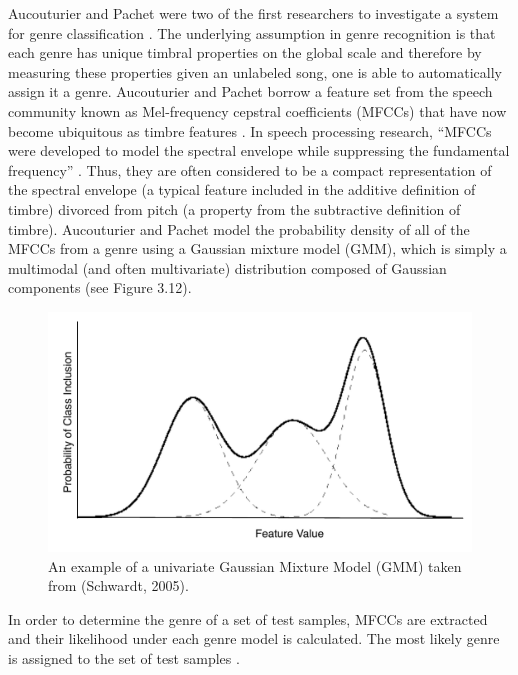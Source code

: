\documentclass[12pt]{report} 	%
\numberwithin{figure}{chapter}
\numberwithin{table}{chapter}
\numberwithin{equation}{chapter}
\begin{document}
\begin{flushleft}
Aucouturier and Pachet were two of the first researchers to investigate a system for genre classification \cite{Aucouturier:2002gf}. The underlying assumption in genre recognition is that each genre has unique timbral properties on the global scale and therefore by measuring these properties given an unlabeled song, one is able to automatically assign it a genre. Aucouturier and Pachet borrow a feature set from the speech community known as Mel-frequency cepstral coefficients (MFCCs) that have now become ubiquitous as timbre features \cite[p. 1]{Aucouturier:2002gf}. In speech processing research, ``MFCCs were developed to model the spectral envelope while suppressing the fundamental frequency'' \cite[p. 1]{Jensen:2006dw}. Thus, they are often considered to be a compact representation of the spectral envelope (a typical feature included in the additive definition of timbre) divorced from pitch (a property from the subtractive definition of timbre). Aucouturier and Pachet model the probability density of all of the MFCCs from a genre using a Gaussian mixture model (GMM), which is simply a multimodal (and often multivariate) distribution composed of Gaussian components (see Figure 3.12). 
\begin{figure}[h!]
\begin{center}
\includegraphics[scale=0.70]{GMM}
\caption[Gaussian mixture models]{An example of a univariate Gaussian Mixture Model (GMM) taken from (Schwardt, 2005).}
\end{center}
\end{figure}
In order to determine the genre of a set of test samples, MFCCs are extracted and their likelihood under each genre model is calculated. The most likely genre is assigned to the set of test samples \cite[p. 2]{Aucouturier:2002gf}.


\end{flushleft}
\end{document}
